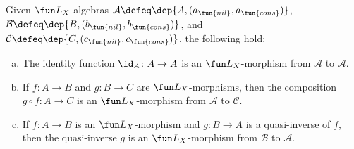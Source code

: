 \begin{lem}\label{lem:L_X-morphisms-are-morphisms}
    Given $\fun L_X$-algebras $\mathcal{A}\defeq\dep{A,(a_{\fun{nil}}, a_{\fun{cons}})}$, $\mathcal{B}\defeq\dep{B,(b_{\fun{nil}},b_{\fun{cons}})}$, and $\mathcal{C}\defeq\dep{C,(c_{\fun{nil}}, c_{\fun{cons}})}$, the following hold:
    \begin{enumerate}[a),font=\upshape]
        \item The identity function $\id_A\colon A\to A$ is an $\fun L_X$-morphism from $\mathcal{A}$ to $\mathcal{A}$.
        \item If $f\colon A\to B$ and $g\colon B\to C$ are $\fun L_X$-morphisms, then the composition $g\circ f\colon A\to C$ is an $\fun L_X$-morphism from $\mathcal{A}$ to $\mathcal{C}$.
        \item If $f\colon A\to B$ is an $\fun L_X$-morphism and $g\colon B\to A$ is a quasi-inverse of $f$, then the quasi-inverse $g$ is an $\fun L_X$-morphism from $\mathcal{B}$ to $\mathcal{A}$.
    \end{enumerate}
\end{lem}

